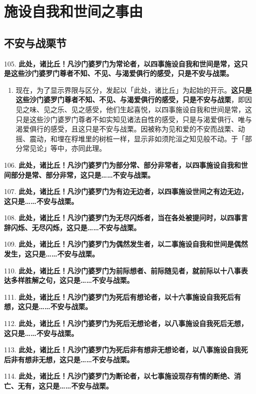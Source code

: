 \section{施设自我和世间之事由}

\subsection{不安与战栗节}

{\Large 105.} \textbf{此处，诸比丘！凡沙门婆罗门为常论者，以四事施设自我和世间是常，这只是这些沙门婆罗门尊者不知、不见、与渴爱俱行的感受，只是不安与战栗。}

\begin{enumerate}\item 现在，为了显示界限与区分，发起以「此处，诸比丘」为起始的开示。\textbf{这只是这些沙门婆罗门尊者不知、不见、与渴爱俱行的感受，只是不安与战栗}，即因见之味、见之乐、见之感受，他们生起喜悦，以四事施设自我和世间是常，这只是这些沙门婆罗门尊者不如实知见诸法自性的感受，只是与渴爱俱行、唯与渴爱俱行的感受，且这只是不安与战栗。因被称为见和爱的不安而战栗、动摇、震动，和埋在稃堆里的树桩一样，显示非如须陀洹之知见般不动。于「部分常见论」等中，亦同此理。\end{enumerate}

{\Large 106.} \textbf{此处，诸比丘！凡沙门婆罗门为部分常、部分非常者，以四事施设自我和世间部分是常、部分非常，这只是……不安与战栗。}

{\Large 107.} \textbf{此处，诸比丘！凡沙门婆罗门为有边无边者，以四事施设世间之有边无边，这只是……不安与战栗。}

{\Large 108.} \textbf{此处，诸比丘！凡沙门婆罗门为无尽闪烁者，当在各处被提问时，以四事言辞闪烁、无尽闪烁，这只是……不安与战栗。}

{\Large 109.} \textbf{此处，诸比丘！凡沙门婆罗门为偶然发生者，以二事施设自我和世间是偶然发生，这只是……不安与战栗。}

{\Large 110.} \textbf{此处，诸比丘！凡沙门婆罗门为前际想者、前际随见者，就前际以十八事表达多样胜解之句，这只是……不安与战栗。}

{\Large 111.} \textbf{此处，诸比丘！凡沙门婆罗门为死后有想论者，以十六事施设自我死后有想，这只是……不安与战栗。}

{\Large 112.} \textbf{此处，诸比丘！凡沙门婆罗门为死后无想论者，以八事施设自我死后无想，这只是……不安与战栗。}

{\Large 113.} \textbf{此处，诸比丘！凡沙门婆罗门为死后非有想非无想论者，以八事施设自我死后非有想非无想，这只是……不安与战栗。}

{\Large 114.} \textbf{此处，诸比丘！凡沙门婆罗门为断论者，以七事施设现存有情的断绝、消亡、无有，这只是……不安与战栗。}

